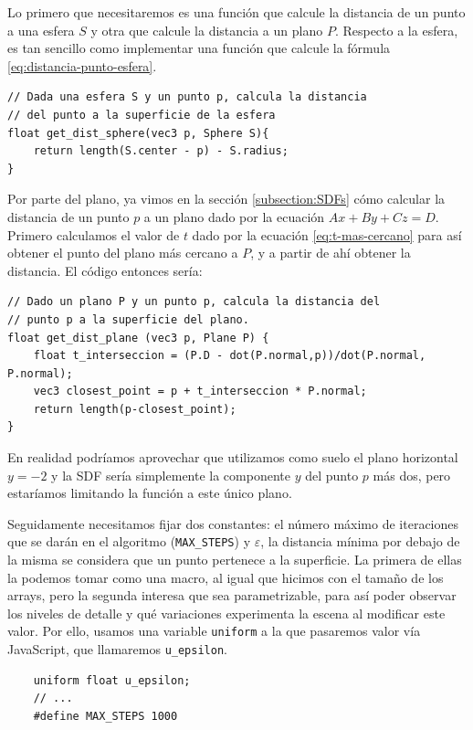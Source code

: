 Lo primero que necesitaremos es una función que calcule la distancia de un punto a una esfera $S$ y otra que calcule la distancia a un plano $P$. Respecto a la esfera, es tan sencillo como implementar una función que calcule la fórmula \ref{eq:distancia-punto-esfera}.

\begin{lstlisting}
// Dada una esfera S y un punto p, calcula la distancia
// del punto a la superficie de la esfera
float get_dist_sphere(vec3 p, Sphere S){
    return length(S.center - p) - S.radius;
}
\end{lstlisting}

Por parte del plano, ya vimos en la sección \ref{subsection:SDFs} cómo calcular la distancia de un punto $p$ a un plano dado por la ecuación $Ax+By+Cz=D$. Primero calculamos el valor de $t$ dado por la ecuación \ref{eq:t-mas-cercano} para así obtener el punto del plano más cercano a $P$, y a partir de ahí obtener la distancia. El código entonces sería:

\begin{lstlisting}
// Dado un plano P y un punto p, calcula la distancia del 
// punto p a la superficie del plano.
float get_dist_plane (vec3 p, Plane P) {
    float t_interseccion = (P.D - dot(P.normal,p))/dot(P.normal, P.normal);
    vec3 closest_point = p + t_interseccion * P.normal;
    return length(p-closest_point);
}
\end{lstlisting}

En realidad podríamos aprovechar que utilizamos como suelo el plano horizontal $y=-2$ y la SDF sería simplemente la componente $y$ del punto $p$ más dos, pero estaríamos limitando la función a este único plano.

Seguidamente necesitamos fijar dos constantes: el número máximo de iteraciones que se darán en el algoritmo (\texttt{MAX\_STEPS}) y $\varepsilon$, la distancia mínima por debajo de la misma se considera que un punto pertenece a la superficie. La primera de ellas la podemos tomar como una macro, al igual que hicimos con el tamaño de los arrays, pero la segunda interesa que sea parametrizable, para así poder observar los niveles de detalle y qué variaciones experimenta la escena al modificar este valor. Por ello, usamos una variable \verb|uniform| a la que pasaremos valor vía JavaScript, que llamaremos \texttt{u\_epsilon}.

\begin{lstlisting}
    uniform float u_epsilon;
    // ... 
    #define MAX_STEPS 1000
\end{lstlisting}



